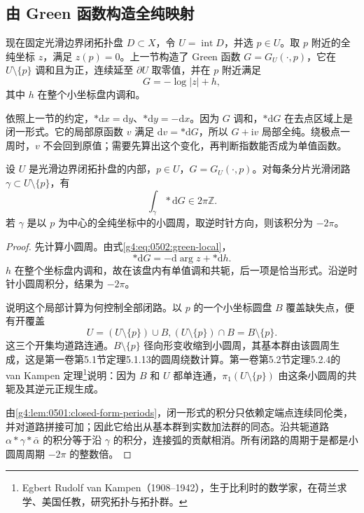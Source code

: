\subsection{由 Green 函数构造全纯映射}
\label{g4:subsec:0502:02}

现在固定光滑边界闭拓扑盘 \(D\subset X\)，令 \(U=\operatorname{int}D\)，并选 \(p\in U\)。取 \(p\) 附近的全纯坐标 \(z\)，满足 \(z(p)=0\)。上一节构造了 Green 函数 \(G=G_U(\cdot,p)\)，它在 \(U\setminus\{p\}\) 调和且为正，连续延至 \(\partial U\) 取零值，并在 \(p\) 附近满足
\begin{equation}
	\label{g4:eq:0502:green-local}
	G=-\log|z|+h,
\end{equation}
其中 \(h\) 在整个小坐标盘内调和。

\ProseParagraphBreak

依照上一节的约定，\(*\mathrm{d}x=\mathrm{d}y\)、\(*\mathrm{d}y=-\mathrm{d}x\)。因为 \(G\) 调和，\(*\mathrm{d}G\) 在去点区域上是闭一形式。它的局部原函数 \(v\) 满足 \(\mathrm{d}v=*\mathrm{d}G\)，所以 \(G+\mathrm{i}v\) 局部全纯。绕极点一周时，\(v\) 不会回到原值；需要先算出这个变化，再判断指数能否成为单值函数。

\begin{lemma}
	\label{g4:lem:0502:green-periods}
	设 \(U\) 是光滑边界闭拓扑盘的内部，\(p\in U\)，\(G=G_U(\cdot,p)\)。对每条分片光滑闭路 \(\gamma\subset U\setminus\{p\}\)，有
	\[
		\int_\gamma *\mathrm{d}G\in2\pi\mathbb Z.
	\]
	若 \(\gamma\) 是以 \(p\) 为中心的全纯坐标中的小圆周，取逆时针方向，则该积分为 \(-2\pi\)。
\end{lemma}
\begin{proof}
	先计算小圆周。由式\eqref{g4:eq:0502:green-local}，
	\[
		*\mathrm{d}G=-\mathrm{d}\arg z+*\mathrm{d}h.
	\]
	\(h\) 在整个坐标盘内调和，故在该盘内有单值调和共轭，后一项是恰当形式。沿逆时针小圆周积分，结果为 \(-2\pi\)。

	说明这个局部计算为何控制全部闭路。以 \(p\) 的一个小坐标圆盘 \(B\) 覆盖缺失点，便有开覆盖
	\[
		U=(U\setminus\{p\})\cup B,
		(U\setminus\{p\})\cap B=B\setminus\{p\}.
	\]
	这三个开集均道路连通。\(B\setminus\{p\}\) 径向形变收缩到小圆周，其基本群由该圆周生成，这是第一卷第5.1节定理5.1.13的圆周绕数计算。第一卷第5.2节定理5.2.4的 van Kampen 定理\footnote{Egbert Rudolf van Kampen（1908--1942），生于比利时的数学家，在荷兰求学、美国任教，研究拓扑与拓扑群。}说明：因为 \(B\) 和 \(U\) 都单连通，\(\pi_1(U\setminus\{p\})\) 由这条小圆周的共轭及其逆元正规生成。

	由\cref{g4:lem:0501:closed-form-periods}，闭一形式的积分只依赖定端点连续同伦类，并对道路拼接可加；因此它给出从基本群到实数加法群的同态。沿共轭道路 \(\alpha*\gamma*\bar\alpha\) 的积分等于沿 \(\gamma\) 的积分，连接弧的贡献相消。所有闭路的周期于是都是小圆周周期 \(-2\pi\) 的整数倍。
\end{proof}

